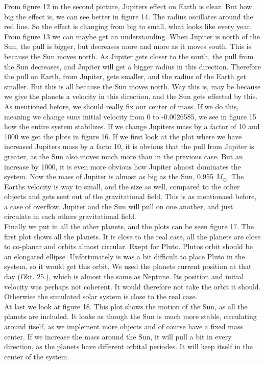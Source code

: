 \documentclass[a4paper,12pt, english]{article}
\begin{document}
From figure 12 in the second picture, Jupiters effect on Earth is clear. But how big the effect is, we can see better in figure 14. The radius oscillates around the red line. So the effect is changing from big to small, what looks like every year. From figure 13 we can maybe get an understanding. When Jupiter is north of the Sun, the pull is bigger, but decreases more and more as it moves south. This is because the Sun moves north. As Jupiter gets closer to the south, the pull from the Sun decreases, and Jupiter will get a bigger radius in this direction. Therefore the pull on Earth, from Jupiter, gets smaller, and the radius of the Earth get smaller. But this is all because the Sun moves north. Way this is, may be because we give the planets a velocity in this direction, and the Sun gets effected by this. \\

As mentioned before, we should really fix our center of mass. If we do this, meaning we change suns initial velocity from 0 to -0.0026585, we see in figure 15 how the entire system stabilizes. 
If we change Jupiters mass by a factor of 10 and 1000 we get the plots in figure 16. If we first look at the plot where we have increased Jupiters mass by a facto 10, it is obvious that the pull from Jupiter is greater, as the Sun also moves much more than in the previous case. But an increase by 1000, it is even more obvious how Jupiter almost dominates the system. Now the mass of Jupiter is almost as big as the Sun, 0.955 $M_{\odot}$. The Earths velocity is way to small, and the size as well, compared to the other objects and gets sent out of the gravitational field. This is as mentionaed before, a case of overflow. Jupiter and the Sun will pull on one another, and just circulate in each others gravitational field.\\

 Finally we put in all the other planets, and the plots can be seen figure 17. The first plot shows all the planets. It is close to the real case, all the planets are close to co-planar and orbits almost circular. Exept for Pluto. Plutos orbit should be an elongated ellipse. Unfortunately is was a bit difficult to place Pluto in the system, so it would get this orbit. We used the planets current position at that day (Okt. 25.), which is almost the same as Neptune. Its position and initial velocity was perhaps not coherent. It would therefore not take the orbit it should. Otherwise the simulated solar system is close to the real case.\\ 

At last we look at figure 18. This plot shows the motion of the Sun, as all the planets are included. It looks as though the Sun is much more stable, circulating around itself, as we implement more objects and of course have a fixed mass center.  
If we increase the mass around the Sun, it will pull a bit in every direction, as the planets have different orbital periodes. It will keep itself in the center of the system. 
 
\end{document}
